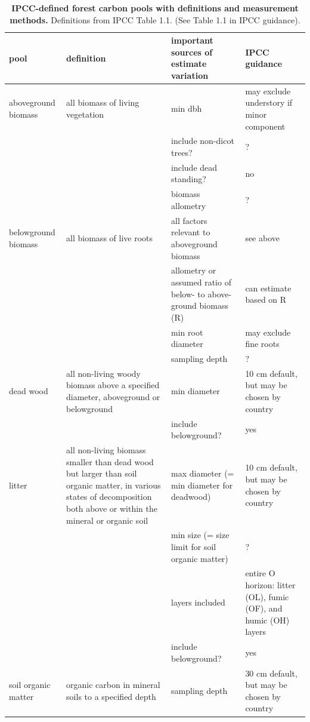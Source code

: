 \documentclass[, manuscript]{copernicus}
\begin{document}
\begin{table}

\caption{\label{tab:table_pools}\textbf{IPCC-defined forest carbon pools with definitions and measurement methods.} Definitions from IPCC Table 1.1. (See Table 1.1 in IPCC guidance).}
\centering
\begin{tabu} to 
\hline
\textbf{pool} & \textbf{definition} & \textbf{important sources of estimate variation} & \textbf{IPCC guidance}\\
\hline
aboveground biomass & all biomass of living vegetation & min dbh & may exclude understory if minor component\\
\hline
 &  & include non-dicot trees? & ?\\
\hline
 &  & include dead standing? & no\\
\hline
 &  & biomass allometry & ?\\
\hline
belowground biomass & all biomass of live roots & all factors relevant to aboveground biomass & see above\\
\hline
 &  & allometry or assumed ratio of below- to above-ground biomass (R) & can estimate based on R\\
\hline
 &  & min root diameter & may exclude fine roots\\
\hline
 &  & sampling depth & ?\\
\hline
dead wood & all non-living woody biomass above a specified diameter, aboveground or belowground & min diameter & 10 cm default, but may be chosen by country\\
\hline
 &  & include belowground? & \vphantom{1} yes\\
\hline
litter & all non-living biomass smaller than dead wood but larger than soil organic matter, in various states of decomposition both above or within the mineral or organic soil & max diameter (= min diameter for deadwood) & 10 cm default, but may be chosen by country\\
\hline
 &  & min size (= size limit for soil organic matter) & ?\\
\hline
 &  & layers included & entire O horizon: litter (OL),  fumic (OF),  and  humic (OH) layers\\
\hline
 &  & include belowground? & yes\\
\hline
soil organic matter & organic carbon in mineral soils to a specified depth & sampling depth & 30 cm default, but may be chosen by country\\
\hline
\end{tabu}
\end{table}
\end{document}
